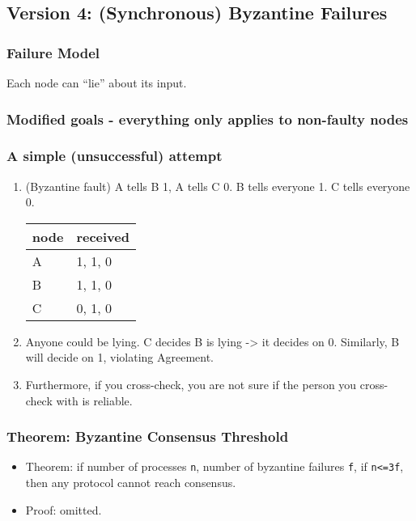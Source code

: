 \documentclass[11pt]{article}
\begin{document}
\subsection{Version 4: (Synchronous) Byzantine Failures}
\label{sec:org7026a71}
\subsubsection{Failure Model}
\label{sec:orgb5ec6a5}
Each node can ``lie'' about its input.
\subsubsection{Modified goals - everything only applies to non-faulty nodes}
\label{sec:org9b180d8}
\subsubsection{A simple (unsuccessful) attempt}
\label{sec:orgd0f876e}
\begin{enumerate}
  \item (Byzantine fault) A tells B 1, A tells C 0.
        B tells everyone 1.
        C tells everyone 0.
        \begin{center}
          \begin{tabular}{ll}
            node & received\\
            \hline
            A & 1, 1, 0\\
            B & 1, 1, 0\\
            C & 0, 1, 0\\
          \end{tabular}
        \end{center}
  \item Anyone could be lying. C decides B is lying -> it decides on 0. Similarly, B
        will decide on 1, violating Agreement.
  \item Furthermore, if you cross-check, you are not sure if the person you
        cross-check with is reliable.
\end{enumerate}
\subsubsection{Theorem: Byzantine Consensus Threshold}
\label{sec:orgdbbb288}
\begin{itemize}
  \item Theorem: if number of processes \texttt{n}, number of byzantine failures \texttt{f}, if
        \texttt{n<=3f}, then any protocol cannot reach consensus.
  \item Proof: omitted.
\end{itemize}
\end{document}
